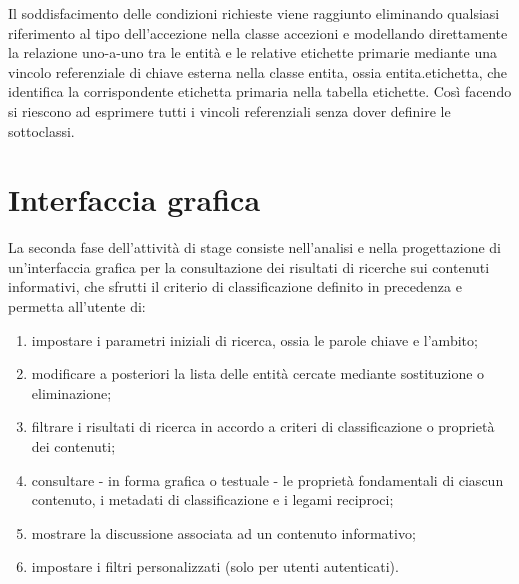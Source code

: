 Il soddisfacimento delle condizioni richieste viene raggiunto eliminando qualsiasi riferimento al tipo dell'accezione nella classe \textsf{accezioni} e modellando direttamente la relazione uno-a-uno tra le entità e le relative etichette primarie mediante una vincolo referenziale di chiave esterna nella classe \textsf{entita}, ossia \textsf{entita.etichetta}, che identifica la corrispondente etichetta primaria nella tabella \textsf{etichette}. Così facendo si riescono ad esprimere tutti i vincoli referenziali senza dover definire le sottoclassi.

\section{Interfaccia grafica}
\label{sec:tesi:stage:gui}
La seconda fase dell'attività di stage consiste nell'analisi e nella progettazione di un'interfaccia grafica per la consultazione dei risultati di ricerche sui contenuti informativi, che sfrutti il criterio di classificazione definito in precedenza e permetta all'utente di:
\begin{enumerate}
	\item impostare i parametri iniziali di ricerca, ossia le parole chiave e l'ambito;
	\item modificare a posteriori la lista delle entità cercate mediante sostituzione o eliminazione;
	\item filtrare i risultati di ricerca in accordo a criteri di classificazione o proprietà dei contenuti;
	\item consultare - in forma grafica o testuale - le proprietà fondamentali di ciascun contenuto, i metadati di classificazione e i legami reciproci;
	\item mostrare la discussione associata ad un contenuto informativo;
	\item impostare i filtri personalizzati (solo per utenti autenticati).
\end{enumerate}

